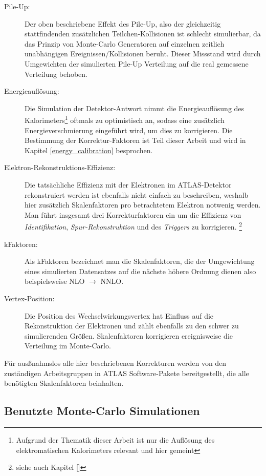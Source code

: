 \begin{description}
    \item[Pile-Up:] Der oben beschriebene Effekt des Pile-Up, also der
        gleichzeitig stattfindenden zusätzlichen Teilchen-Kollisionen ist
        schlecht simulierbar, da das Prinzip von Monte-Carlo Generatoren auf
        einzelnen zeitlich unabhängigen Ereignissen/Kollisionen beruht. Dieser
        Missstand wird durch Umgewichten der simulierten Pile-Up Verteilung auf
        die real gemessene Verteilung behoben.
    \item[Energieauflösung:] Die Simulation der Detektor-Antwort nimmt die
        Energieauflösung des Kalorimeters\footnote{Aufgrund der Thematik dieser
        Arbeit ist nur die Auflösung des elektromatischen Kalorimeters relevant
        und hier gemeint} oftmals zu optimistisch an, sodass eine zusätzlich
        Energieverschmierung eingeführt wird, um dies zu korrigieren. Die
        Bestimmung der Korrektur-Faktoren ist Teil dieser Arbeit und wird in
        Kapitel \ref{energy_calibration} besprochen.
    \item[Elektron-Rekonstruktions-Effizienz:] Die tatsächliche Effizienz mit
        der Elektronen im ATLAS-Detektor rekonstruiert werden ist ebenfalls
        nicht einfach zu beschreiben, weshalb hier zusätzlich Skalenfaktoren
        pro betrachtetem Elektron notwenig werden. Man führt insgesamt drei
        Korrekturfaktoren ein um die Effizienz von \textit{Identifikation},
        \textit{Spur-Rekonstruktion} und des \textit{Triggers} zu korrigieren.
        \footnote{siehe auch Kapitel \ref{}}
    \item[kFaktoren:] Als kFaktoren bezeichnet man die Skalenfaktoren, die der
        Umgewichtung eines simulierten Datensatzes auf die nächste höhere
        Ordnung dienen also beispielsweise NLO $\rightarrow$ NNLO.
    \item[Vertex-Position:] Die Position des Wechselwirkungsvertex hat Einfluss
        auf die Rekonstruktion der Elektronen und zählt ebenfalls zu den schwer
        zu simulierenden Größen. Skalenfaktoren korrigieren ereignisweise die
        Verteilung im Monte-Carlo.
\end{description}

Für ausßnahmslos alle hier beschriebenen Korrekturen werden von den zuständigen
Arbeitsgruppen in ATLAS Software-Pakete bereitgestellt, die alle benötigten
Skalenfaktoren beinhalten.



\subsection{Benutzte Monte-Carlo Simulationen}
\label{used_mc_samples}








